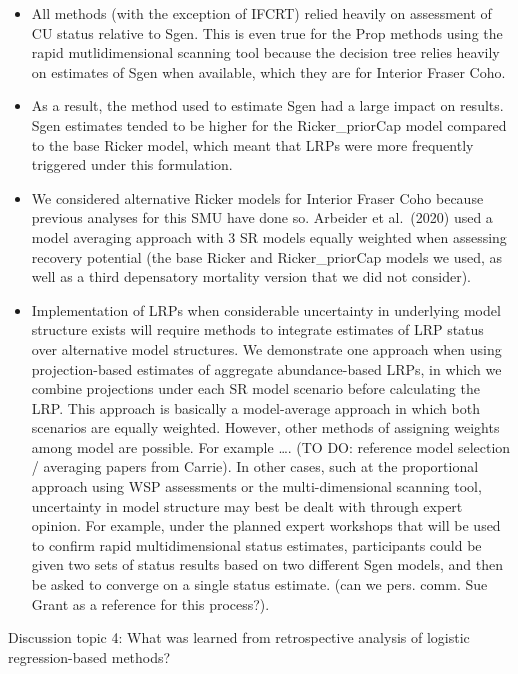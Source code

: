 \documentclass[11pt]{book}
\begin{document}
\begin{itemize}

\item
  All methods (with the exception of IFCRT) relied heavily on assessment of CU status relative to Sgen. This is even true for the Prop methods using the rapid mutlidimensional scanning tool because the decision tree relies heavily on estimates of Sgen when available, which they are for Interior Fraser Coho.
\item
  As a result, the method used to estimate Sgen had a large impact on results. Sgen estimates tended to be higher for the Ricker\_priorCap model compared to the base Ricker model, which meant that LRPs were more frequently triggered under this formulation.
\item
  We considered alternative Ricker models for Interior Fraser Coho because previous analyses for this SMU have done so. Arbeider et al.~(2020) used a model averaging approach with 3 SR models equally weighted when assessing recovery potential (the base Ricker and Ricker\_priorCap models we used, as well as a third depensatory mortality version that we did not consider).
\item
  Implementation of LRPs when considerable uncertainty in underlying model structure exists will require methods to integrate estimates of LRP status over alternative model structures. We demonstrate one approach when using projection-based estimates of aggregate abundance-based LRPs, in which we combine projections under each SR model scenario before calculating the LRP. This approach is basically a model-average approach in which both scenarios are equally weighted. However, other methods of assigning weights among model are possible. For example \ldots. (TO DO: reference model selection / averaging papers from Carrie). In other cases, such at the proportional approach using WSP assessments or the multi-dimensional scanning tool, uncertainty in model structure may best be dealt with through expert opinion. For example, under the planned expert workshops that will be used to confirm rapid multidimensional status estimates, participants could be given two sets of status results based on two different Sgen models, and then be asked to converge on a single status estimate. (can we pers. comm. Sue Grant as a reference for this process?).
\end{itemize}
Discussion topic 4: What was learned from retrospective analysis of logistic regression-based methods?
\end{document}
